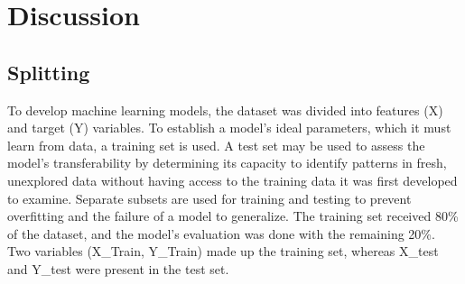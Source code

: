 \documentclass{article}
\begin{document}
\begin{table}[htbp]
    \centering
    \caption{Correlation matrix of all variables}
    \label{tab:correlation_matrix}
\end{table}

\section{Discussion}

\subsection{Splitting}
To develop machine learning models, the dataset was divided into features (X) and target (Y) variables. To establish a model's ideal parameters, which it must learn from data, a training set is used. A test set may be used to assess the model's transferability by determining its capacity to identify patterns in fresh, unexplored data without having access to the training data it was first developed to examine. Separate subsets are used for training and testing to prevent overfitting and the failure of a model to generalize. The training set received 80\% of the dataset, and the model's evaluation was done with the remaining 20\%. Two variables (X\_Train, Y\_Train) made up the training set, whereas X\_test and Y\_test were present in the test set.
\end{document}
